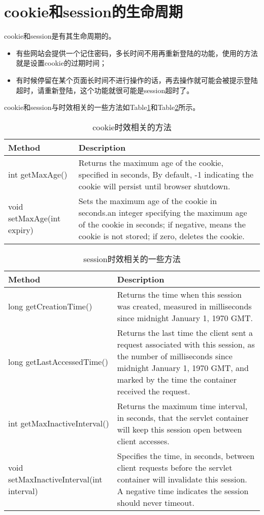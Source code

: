 \section{cookie和session的生命周期}
cookie和session是有其生命周期的。
\begin{itemize}
\item
有些网站会提供一个记住密码，多长时间不用再重新登陆的功能，使用的方法就是设置cookie的过期时间；
\item
有时候停留在某个页面长时间不进行操作的话，再去操作就可能会被提示登陆超时，请重新登陆，这个功能就很可能是session超时了。
\end{itemize}
cookie和session与时效相关的一些方法如Table\ref{cookie}和Table\ref{session}所示。
\begin{table}
\begin{tabular}{lp{25em}}
\toprule
\textbf{Method}&\textbf{Description}\\
\midrule
int getMaxAge()&  Returns the maximum age of the cookie, specified in seconds, By default, -1 indicating the cookie will persist until browser shutdown.\\
void setMaxAge(int expiry) &  Sets the maximum age of the cookie in seconds.an integer specifying the maximum age of the cookie in seconds; if negative, means the cookie is not stored; if zero, deletes the cookie.\\
\bottomrule
\end{tabular}
\caption{cookie时效相关的方法}
\label{cookie}
\end{table}
\begin{table}
\begin{tabular}{lp{20em}}
\toprule
\textbf{Method}&\textbf{Description}\\
\midrule
long getCreationTime() &  Returns the time when this session was created, measured in milliseconds since midnight January 1, 1970 GMT.\\
long getLastAccessedTime() & Returns the last time the client sent a request associated with this session, as the number of milliseconds since midnight January 1, 1970 GMT, and marked by the time the container received the request.\\
int getMaxInactiveInterval() &  Returns the maximum time interval, in seconds, that the servlet container will keep this session open between client accesses.\\
void 	setMaxInactiveInterval(int interval) &  Specifies the time, in seconds, between client requests before the servlet container will invalidate this session. A negative time indicates the session should never timeout.\\
\bottomrule
\end{tabular}
\caption{session时效相关的一些方法}
\label{session}
\end{table}
